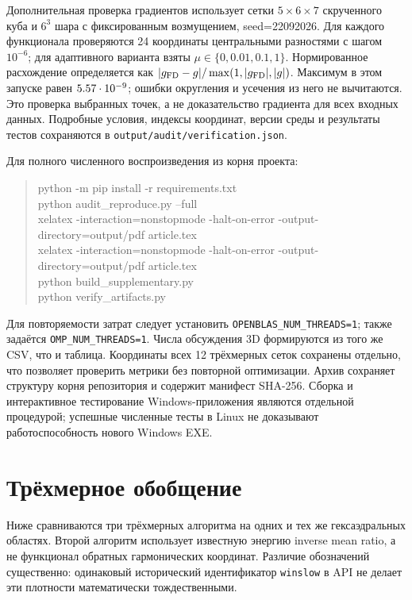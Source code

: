 \documentclass[11pt,a4paper]{article}
\begin{document}
Дополнительная проверка градиентов использует сетки $5\times6\times7$
скрученного куба и $6^3$ шара с фиксированным возмущением, seed=22092026.
Для каждого функционала проверяются 24 координаты центральными
разностями с шагом $10^{-6}$; для адаптивного варианта взяты
$\mu\in\{0,0.01,0.1,1\}$. Нормированное расхождение определяется как
$|g_{\rm FD}-g|/\max(1,|g_{\rm FD}|,|g|)$.
Максимум в этом запуске равен $5.57\cdot10^{-9}$; ошибки округления
и усечения из него не вычитаются. Это проверка выбранных точек, а не
доказательство градиента для всех входных данных.
Подробные условия, индексы координат, версии среды и результаты тестов
сохраняются в \texttt{output/audit/verification.json}.

Для полного численного воспроизведения из корня проекта:
\begin{quote}\ttfamily\scriptsize
python -m pip install -r requirements.txt\\
python audit\_reproduce.py --full\\
xelatex -interaction=nonstopmode -halt-on-error -output-directory=output/pdf article.tex\\
xelatex -interaction=nonstopmode -halt-on-error -output-directory=output/pdf article.tex\\
python build\_supplementary.py\\
python verify\_artifacts.py
\end{quote}
Для повторяемости затрат следует установить
\texttt{OPENBLAS\_NUM\_THREADS=1}; также задаётся \texttt{OMP\_NUM\_THREADS=1}.
Числа обсуждения 3D формируются из того же CSV, что и таблица.
Координаты всех 12 трёхмерных сеток сохранены отдельно, что позволяет
проверить метрики без повторной оптимизации. Архив сохраняет структуру
корня репозитория и содержит манифест SHA-256.
Сборка и интерактивное тестирование Windows-приложения являются
отдельной процедурой; успешные численные тесты в Linux не доказывают
работоспособность нового Windows EXE.

\FloatBarrier
\section{Трёхмерное обобщение}

Ниже сравниваются три трёхмерных алгоритма на одних и тех же
гексаэдральных областях. Второй алгоритм использует известную энергию
inverse mean ratio, а не функционал обратных гармонических координат.
Различие обозначений существенно: одинаковый исторический идентификатор
\texttt{winslow} в API не делает эти плотности математически тождественными.
\end{document}
